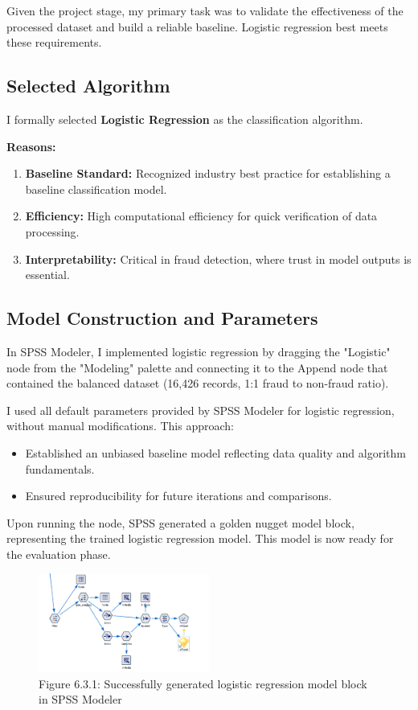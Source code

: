 \documentclass[sigplan,screen]{acmart}
\begin{document}
Given the project stage, my primary task was to validate the effectiveness of the processed dataset and build a reliable baseline. Logistic regression best meets these requirements.

\subsection{Selected Algorithm}

I formally selected \textbf{Logistic Regression} as the classification algorithm.

\textbf{Reasons:}

\begin{enumerate}
    \item \textbf{Baseline Standard:} Recognized industry best practice for establishing a baseline classification model.
    \item \textbf{Efficiency:} High computational efficiency for quick verification of data processing.
    \item \textbf{Interpretability:} Critical in fraud detection, where trust in model outputs is essential.
\end{enumerate}

\subsection{Model Construction and Parameters}

In SPSS Modeler, I implemented logistic regression by dragging the "Logistic" node from the "Modeling" palette and connecting it to the Append node that contained the balanced dataset (16,426 records, 1:1 fraud to non-fraud ratio).

I used all default parameters provided by SPSS Modeler for logistic regression, without manual modifications. This approach:

\begin{itemize}
    \item Established an unbiased baseline model reflecting data quality and algorithm fundamentals.
    \item Ensured reproducibility for future iterations and comparisons.
\end{itemize}

Upon running the node, SPSS generated a golden nugget model block, representing the trained logistic regression model. This model is now ready for the evaluation phase.

\begin{figure}[H]
    \centering
    \includegraphics[width=0.5\textwidth]{6.3.1.png}
    \caption*{Figure 6.3.1: Successfully generated logistic regression model block in SPSS Modeler}
    \label{fig:6.3.1}
\end{figure}
\end{document}
